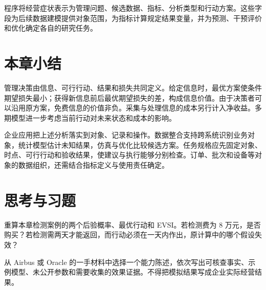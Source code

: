 程序将经营症状表示为管理问题、候选数据、指标、分析类型和行动方案。这些字段为后续数据建模提供对象范围，为指标计算规定结果变量，并为预测、干预评价和优化确定各自的研究任务。

\section*{本章小结}

管理决策由信息、可行行动、结果和损失共同定义。给定信息时，最优方案使条件期望损失最小；获得新信息前后最优期望损失的差，构成信息价值。由于决策者可以沿用原方案，免费信息的价值非负。采集与处理信息的成本另行计入净收益。多期模型进一步考虑当前行动对未来状态和成本的影响。

企业应用把上述分析落实到对象、记录和操作。数据整合支持跨系统识别业务对象，统计模型估计未知结果，仿真与优化比较候选方案。任务规格应先固定对象、时点、可行行动和验收结果，使建议与执行能够分别检查。订单、批次和设备等对象的数据组织，还需结合指标定义与使用责任确定。


\section*{思考与习题}

\begin{exercise}[完整信息价值计算]
重算本章检测案例的两个后验概率、最优行动和 EVSI。若检测费为 8 万元，是否购买？若检测需两天才能返回，而行动必须在一天内作出，原计算中的哪个假设失效？
\end{exercise}
\begin{exercise}[平台案例的证据审计]
从 Airbus 或 Oracle 的一手材料中选择一个能力陈述，依次写出可核查事实、示例模型、未公开参数和需要收集的效果证据。不得把模拟结果写成企业实际经营结果。
\end{exercise}

